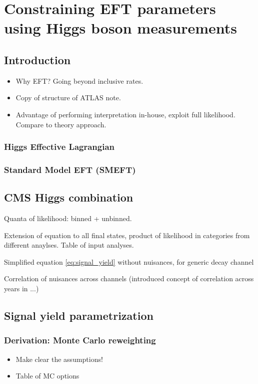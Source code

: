 \chapter{Constraining EFT parameters using Higgs boson measurements}
\label{chap:eft}

\section{Introduction}
\begin{itemize}
    \item Why EFT? Going beyond inclusive rates.
    \item Copy of structure of ATLAS note.
    \item Advantage of performing interpretation in-house, exploit full likelihood. Compare to theory approach.
\end{itemize}

\subsection{Higgs Effective Lagrangian}

\subsection{Standard Model EFT (SMEFT)}

\section{CMS Higgs combination}

Quanta of likelihood: binned + unbinned. 

Extension of equation to all final states, product of likelihood in categories from different anaylses. Table of input analyses.

Simplified equation \ref{eq:signal_yield} without nuisances, for generic decay channel

Correlation of nuisances across channels (introduced concept of correlation across years in ...)
\section{Signal yield parametrization}

\subsection{Derivation: Monte Carlo reweighting}
\begin{itemize}
    \item Make clear the assumptions!
    \item Table of MC options
\end{itemize}
